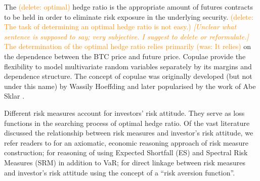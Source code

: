 \documentclass[11pt,a4paper,english]{article}
\providecommand{\natp}[1]{\textcolor{darkorange}{#1}}
\begin{document}
The \natp{(delete: optimal)} hedge ratio is the appropriate amount of
futures contracts to be held in order to eliminate risk exposure in
the underlying security. 
\natp{(delete: The task of determining an optimal hedge ratio is not easy.)} \natp{\em
  [Unclear what sentence is supposed to say; very subjective. I
  suggest to delete or reformulate.]}
\natp{The determination of the optimal hedge ratio relies primarily
  (was: 
It relies)} on the dependence between the BTC price and future price.
Copulae provide the flexibility to model multivariate random variables
separately by its margins and dependence structure.
The concept of copulae was originally developed (but not under this
name) by Wassily Hoeffding \citep{hoeffding1940masstabinvariante}
and later popularised by the work of Abe Sklar \citep{Sklar1959}. \medskip 

Different risk measures account for investors' risk attitude.
They serve as loss functions in the searching process of optimal hedge ratio.
Of the vast literature discussed the relationship between risk
measures and investor's risk attitude, we refer readers to
\citet{artzner1999coherent} for an axiomatic, economic reasoning
approach of risk measure construction;
\citet{embrechts2002correlation} for reasoning of using Expected
Shortfall (ES) and Spectral Risk Measures (SRM) in addition to VaR;
\citet{Acerbi2002} for direct linkage between risk measures and
investor's risk attitude using the concept of a ``risk aversion
function''. \medskip 
\end{document}
